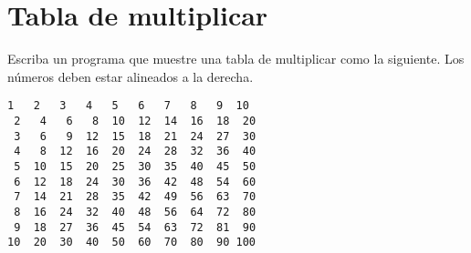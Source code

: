 \section{Tabla de multiplicar}

Escriba un programa que muestre una tabla de multiplicar como la
siguiente.
Los números deben estar alineados a la derecha.
\begin{lstlisting}[language=testcase]
 1   2   3   4   5   6   7   8   9  10
 2   4   6   8  10  12  14  16  18  20
 3   6   9  12  15  18  21  24  27  30
 4   8  12  16  20  24  28  32  36  40
 5  10  15  20  25  30  35  40  45  50
 6  12  18  24  30  36  42  48  54  60
 7  14  21  28  35  42  49  56  63  70
 8  16  24  32  40  48  56  64  72  80
 9  18  27  36  45  54  63  72  81  90
10  20  30  40  50  60  70  80  90 100
\end{lstlisting}

